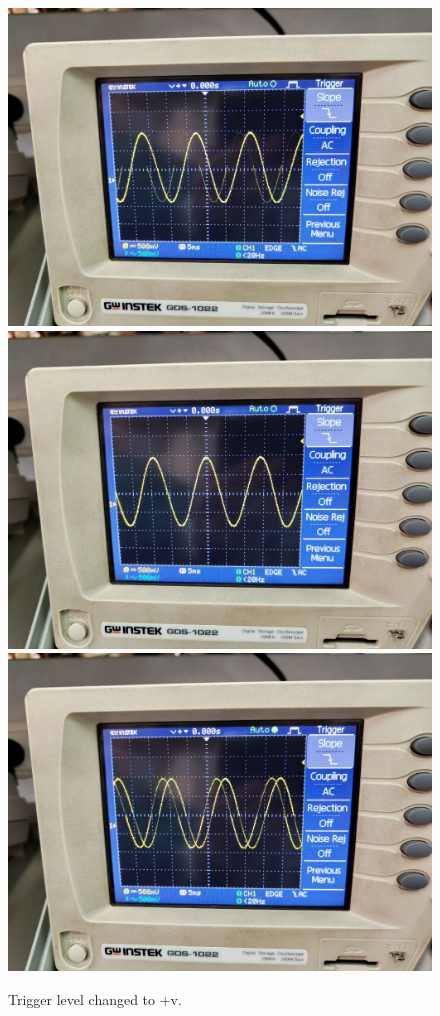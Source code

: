 \documentclass[11pt]{article}
\begin{document}
\begin{question}
{        \begin{figure}[H]
            \begin{center}
                \includegraphics[scale=0.1]{Fig/53.jpeg}
                \includegraphics[scale=0.1]{Fig/54.jpeg}
                \includegraphics[scale=0.1]{Fig/55.jpeg}
                \caption{Trigger level changed to +v.}
            \end{center}
        \end{figure}

}
\end{question}
\end{document}
